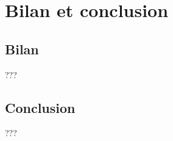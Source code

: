 \documentclass[french]{report}
\begin{document}


\chapter*{Bilan et conclusion}
\section*{Bilan}
???
\section*{Conclusion}
???


\end{document}
